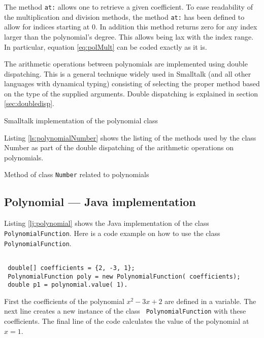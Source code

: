 \documentclass[twoside]{book}
\begin{document}
The method {\tt at:} allows one to retrieve a given coefficient.
To ease readability of the multiplication and division methods,
the method {\tt at:} has been defined to allow for indices
starting at 0. In addition this method returns zero for any index
larger than the polynomial's degree. This allows being lax with
the index range. In particular, equation \ref{eq:polMult} can be
coded exactly as it is.

The arithmetic operations between polynomials are implemented
using double dispatching. This is a general technique widely used
in Smalltalk (and all other languages with dynamical typing)
consisting of selecting the proper method based on the type of the
supplied arguments. Double dispatching is explained in section
\ref{sec:doubledisp}.


\begin{listing}
Smalltalk implementation of the polynomial class
\label{ls:polynomial}

\end{listing}

Listing \ref{ls:polynomialNumber} shows the listing of the methods
used by the class Number as part of the double dispatching of the
arithmetic operations on polynomials.

\begin{listing}
Method of class {\tt Number} related to polynomials
\label{ls:polynomialNumber}

\end{listing}

\subsection{Polynomial --- Java implementation}
 Listing \ref{lj:polynomial} shows the Java
implementation of the class {\tt PolynomialFunction}. Here is a
code example on how to use the class {\tt PolynomialFunction}.
\begin{codeExample}
\begin{verbatim}

 double[] coefficients = {2, -3, 1};
 PolynomialFunction poly = new PolynomialFunction( coefficients);
 double p1 = polynomial.value( 1).
\end{verbatim}
\end{codeExample}
First the coefficients of the polynomial $x^2-3x+2$ are defined in
a variable. The next line creates a new instance of the class {\tt
PolynomialFunction} with these coefficients. The final line of the
code calculates the value of the polynomial at $x=1$.
\end{document}
